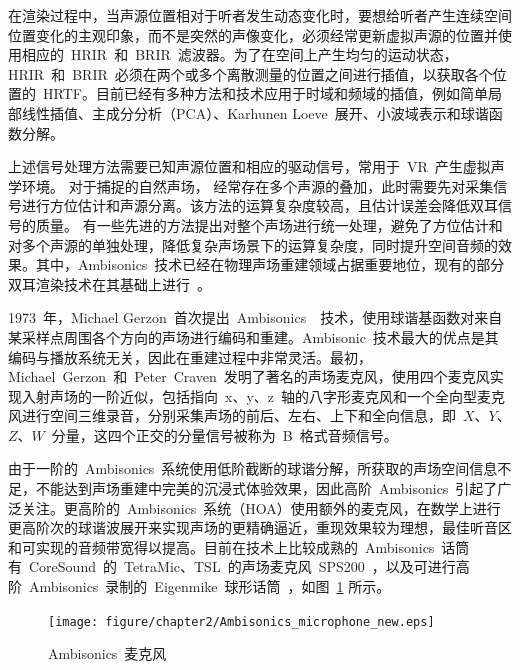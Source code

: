 在渲染过程中，当声源位置相对于听者发生动态变化时，要想给听者产生连续空间位置变化的主观印象，而不是突然的声像变化，必须经常更新虚拟声源的位置并使用相应的~HRIR~和~BRIR~滤波器。为了在空间上产生均匀的运动状态，HRIR~和~BRIR~必须在两个或多个离散测量的位置之间进行插值，以获取各个位置的~HRTF。目前已经有多种方法和技术应用于时域和频域的插值，例如简单局部线性插值、主成分分析（PCA）、Karhunen Loeve~展开、小波域表示和球谐函数分解。


上述信号处理方法需要已知声源位置和相应的驱动信号，常用于~VR~产生虚拟声学环境。 对于捕捉的自然声场， 经常存在多个声源的叠加，此时需要先对采集信号进行方位估计和声源分离。该方法的运算复杂度较高，且估计误差会降低双耳信号的质量。
有一些先进的方法提出对整个声场进行统一处理，避免了方位估计和对多个声源的单独处理，降低复杂声场景下的运算复杂度，同时提升空间音频的效果。其中，Ambisonics~技术已经在物理声场重建领域占据重要地位，现有的部分双耳渲染技术在其基础上进行~。


1973~年，Michael Gerzon~首次提出~Ambisonics~~技术，使用球谐基函数对来自某采样点周围各个方向的声场进行编码和重建。Ambisonic~技术最大的优点是其编码与播放系统无关，因此在重建过程中非常灵活。最初，Michael~Gerzon~和~Peter~Craven~发明了著名的声场麦克风，使用四个麦克风实现入射声场的一阶近似，包括指向~x、y、z~轴的八字形麦克风和一个全向型麦克风进行空间三维录音，分别采集声场的前后、左右、上下和全向信息，即~$X$、$Y$、$Z$、$W$~分量，这四个正交的分量信号被称为~B~格式音频信号。

由于一阶的~Ambisonics~系统使用低阶截断的球谐分解，所获取的声场空间信息不足，不能达到声场重建中完美的沉浸式体验效果，因此高阶~Ambisonics~引起了广泛关注。更高阶的~Ambisonics~系统（HOA）使用额外的麦克风，在数学上进行更高阶次的球谐波展开来实现声场的更精确逼近，重现效果较为理想，最佳听音区和可实现的音频带宽得以提高。目前在技术上比较成熟的~Ambisonics~话筒有~CoreSound~的~TetraMic、TSL~的声场麦克风~SPS200~，以及可进行高阶~Ambisonics~录制的~Eigenmike~球形话筒~，如图~\ref{fig:Ambisonics_microphone} 所示。

\begin{figure}[H]
\centering
\texttt{[image: figure/chapter2/Ambisonics\_microphone\_new.eps]}
\caption{Ambisonics~麦克风}
\label{fig:Ambisonics_microphone}
\end{figure}


